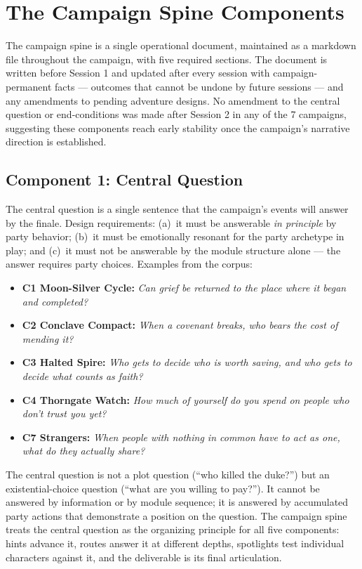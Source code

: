 
\section{The Campaign Spine Components}
\label{sec:components}

The campaign spine is a single operational document, maintained as a markdown file
throughout the campaign, with five required sections. The document is written before
Session 1 and updated after every session with campaign-permanent facts --- outcomes
that cannot be undone by future sessions --- and any amendments to pending adventure
designs. No amendment to the central question or end-conditions was made after
Session 2 in any of the 7 campaigns, suggesting these components reach early stability
once the campaign's narrative direction is established.

\subsection{Component 1: Central Question}

The central question is a single sentence that the campaign's events will answer by
the finale. Design requirements: (a)~it must be answerable \textit{in principle} by
party behavior; (b)~it must be emotionally resonant for the party archetype in play;
and (c)~it must not be answerable by the module structure alone --- the answer
requires party choices. Examples from the corpus:

\begin{itemize}
  \item \textbf{C1 Moon-Silver Cycle:} \textit{Can grief be returned to the place
    where it began and completed?}
  \item \textbf{C2 Conclave Compact:} \textit{When a covenant breaks, who bears the
    cost of mending it?}
  \item \textbf{C3 Halted Spire:} \textit{Who gets to decide who is worth saving,
    and who gets to decide what counts as faith?}
  \item \textbf{C4 Thorngate Watch:} \textit{How much of yourself do you spend on
    people who don't trust you yet?}
  \item \textbf{C7 Strangers:} \textit{When people with nothing in common have to
    act as one, what do they actually share?}
\end{itemize}

The central question is not a plot question (``who killed the duke?'') but an
existential-choice question (``what are you willing to pay?''). It cannot be
answered by information or by module sequence; it is answered by accumulated
party actions that demonstrate a position on the question. The campaign spine
treats the central question as the organizing principle for all five components:
hints advance it, routes answer it at different depths, spotlights test individual
characters against it, and the deliverable is its final articulation.


